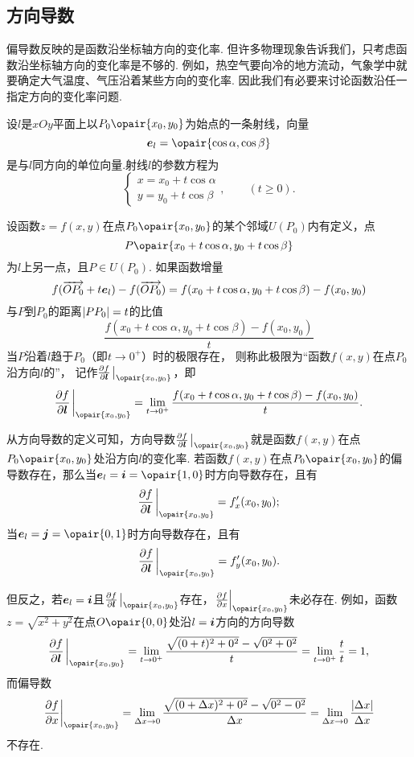 \subsection{方向导数}
偏导数反映的是函数沿坐标轴方向的变化率.
但许多物理现象告诉我们，只考虑函数沿坐标轴方向的变化率是不够的.
例如，热空气要向冷的地方流动，气象学中就要确定大气温度、气压沿着某些方向的变化率.
因此我们有必要来讨论函数沿任一指定方向的变化率问题.

\begin{definition}
设\(l\)是\(xOy\)平面上以\(P_0\opair{x_0,y_0}\)为始点的一条射线，向量\[
\mat{e}_l=\opair{\cos\alpha,\cos\beta}
\]是与\(l\)同方向的单位向量.射线\(l\)的参数方程为\[
\left\{ \begin{array}{l}
x=x_0+t\cos\alpha \\
y=y_0+t\cos\beta
\end{array} \right., \qquad (t \geq 0).
\]

设函数\(z=f(x,y)\)在点\(P_0\opair{x_0,y_0}\)的某个邻域\(U(P_0)\)内有定义，点\[
P\opair{x_0+t\cos\alpha,y_0+t\cos\beta}
\]为\(l\)上另一点，且\(P \in U(P_0)\).
如果函数增量\[
f(\overrightarrow{O P_0} + t \boldsymbol{e}_l) - f(\overrightarrow{O P_0})
= f(x_0+t\cos\alpha,y_0+t\cos\beta)-f(x_0,y_0)
\]与\(P\)到\(P_0\)的距离\(\abs{PP_0}=t\)的比值\[
\frac{f(x_0+t\cos\alpha,y_0+t\cos\beta)-f(x_0,y_0)}{t}
\]当\(P\)沿着\(l\)趋于\(P_0\)（即\(t\to0^+\)）时的极限存在，
则称此极限为“函数\(f(x,y)\)在点\(P_0\)沿方向\(l\)的”，
记作\(\pdv{f}{\mat{l}}\eval_{\opair{x_0,y_0}}\)，即\[
\pdv{f}{\mat{l}}\eval_{\opair{x_0,y_0}}
=\lim\limits_{t\to0^+} \frac{f(x_0+t\cos\alpha,y_0+t\cos\beta)-f(x_0,y_0)}{t}.
\]
\end{definition}

从方向导数的定义可知，方向导数\(\pdv{f}{\mat{l}}\eval_{\opair{x_0,y_0}}\)就是函数\(f(x,y)\)在点\(P_0\opair{x_0,y_0}\)处沿方向\(l\)的变化率.
若函数\(f(x,y)\)在点\(P_0\opair{x_0,y_0}\)的偏导数存在，那么当\(\mat{e}_l = \mat{i} = \opair{1,0}\)时方向导数存在，且有\[
\pdv{f}{\mat{l}}\eval_{\opair{x_0,y_0}} = f'_x(x_0,y_0);
\]当\(\mat{e}_l = \mat{j} = \opair{0,1}\)时方向导数存在，且有\[
\pdv{f}{\mat{l}}\eval_{\opair{x_0,y_0}} = f'_y(x_0,y_0).
\]

但反之，若\(\boldsymbol{e}_l = \boldsymbol{i}\)且\(\pdv{f}{\mat{l}}\eval_{\opair{x_0,y_0}}\)存在，\(\eval{\pdv{f}{x}}_{\opair{x_0,y_0}}\)未必存在.
例如，函数\(z = \sqrt{x^2+y^2}\)在点\(O\opair{0,0}\)处沿\(l = \boldsymbol{i}\)方向的方向导数\[
\pdv{f}{\mat{l}}\eval_{\opair{x_0,y_0}}
= \lim\limits_{t\to0^+} \frac{\sqrt{(0+t)^2+0^2}-\sqrt{0^2+0^2}}{t}
= \lim\limits_{t\to0^+} \frac{t}{t} = 1,
\]而偏导数\[
\eval{\pdv{f}{x}}_{\opair{x_0,y_0}}
= \lim\limits_{\increment x\to0} \frac{\sqrt{(0+\increment x)^2+0^2}-\sqrt{0^2-0^2}}{\increment x}
= \lim\limits_{\increment x\to0} \frac{\abs{\increment x}}{\increment x}
\]不存在.

